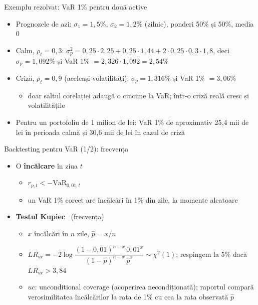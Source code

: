 \begin{frame}{Exemplu rezolvat: VaR 1\% pentru două active}
\itemsize{\small}
\begin{itemize}
    \item Prognozele de azi: $\sigma_1 = 1{,}5\%$, $\sigma_2 = 1{,}2\%$ (zilnic), ponderi 50\% și 50\%, media 0
    \item Calm, $\rho_t = 0{,}3$: $\sigma_p^2 = 0{,}25 \cdot 2{,}25 + 0{,}25 \cdot 1{,}44 + 2 \cdot 0{,}25 \cdot 0{,}3 \cdot 1{,}8$, deci $\sigma_p = 1{,}092\%$ și VaR 1\% $= 2{,}326 \cdot 1{,}092 = 2{,}54\%$
    \item Criză, $\rho_t = 0{,}9$ (aceleași volatilități): $\sigma_p = 1{,}316\%$ și VaR 1\% $= 3{,}06\%$
    \begin{itemize}
        \item doar saltul corelației adaugă o cincime la VaR; într-o criză reală cresc și volatilitățile
    \end{itemize}
    \item Pentru un portofoliu de 1 milion de lei: VaR 1\% de aproximativ 25{,}4 mii de lei în perioada calmă și 30{,}6 mii de lei în cazul de criză
\end{itemize}
\end{frame}

\begin{frame}{Backtesting pentru VaR (1/2): frecvența}
\itemsize{\footnotesize}
\begin{itemize}
    \item O \textbf{încălcare} în ziua $t$
    \begin{itemize}
        \item $r_{p,t} < -\mathrm{VaR}_{0{,}01,t}$
        \item un VaR 1\% corect are încălcări în 1\% din zile, la momente aleatoare
    \end{itemize}
    \item \textbf{Testul Kupiec} \ (frecvența)
    \begin{itemize}
        \item $x$ încălcări în $n$ zile, $\hat p = x/n$
        \item $LR_{uc} = -2\log\dfrac{(1-0{,}01)^{n-x}\,0{,}01^{x}}{(1-\hat p)^{n-x}\,\hat p^{x}} \sim \chi^2(1)$; respingem la 5\% dacă $LR_{uc} > 3{,}84$
        \item $uc$: unconditional coverage (acoperirea necondiționată); raportul compară verosimilitatea încălcărilor la rata de 1\% cu cea la rata observată $\hat p$
    \end{itemize}
\end{itemize}
\end{frame}

